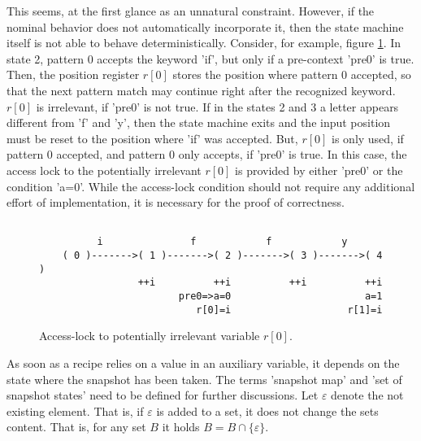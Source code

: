 \documentclass[12pt,a4paper]{scrartcl}
\begin{document}
This seems, at the first glance as an unnatural constraint. However, if the
nominal behavior does not automatically incorporate it, then the state machine
itself is not able to behave deterministically.  Consider, for example, figure
\ref{fig:access-lock}. In state 2, pattern 0 accepts the keyword 'if', but only
if a pre-context 'pre0' is true. Then, the position register $r[0]$ stores the
position where pattern 0 accepted, so that the next pattern match may continue
right after the recognized keyword. $r[0]$ is irrelevant, if 'pre0' is not
true. If in the states 2 and 3 a letter appears different from 'f' and 'y',
then the state machine exits and the input position must be reset to the
position where 'if' was accepted. But, $r[0]$ is only used, if pattern 0
accepted, and pattern 0 only accepts, if 'pre0' is true.  In this case, the
access lock to the potentially irrelevant $r[0]$ is provided by either 'pre0'
or the condition 'a=0'. While the access-lock condition should not require any
additional effort of implementation, it is necessary for the proof of
correctness.

\begin{figure}[htbp] \leavevmode \label{fig:access-lock}
\begin{verbatim}

          i               f            f            y         
    ( 0 )------->( 1 )------->( 2 )------->( 3 )------->( 4 )
                 ++i          ++i          ++i          ++i 
                        pre0=>a=0                       a=1
                           r[0]=i                    r[1]=i

\end{verbatim}
\caption{Access-lock to potentially irrelevant variable $r[0]$.}
\end{figure}

As soon as a recipe relies on a value in an auxiliary variable, it depends on
the state where the snapshot has been taken. The terms 'snapshot map' and 'set
of snapshot states' need to be defined for further discussions. Let
$\varepsilon$ denote the not existing element. That is, if $\varepsilon$ is
added to a set, it does not change the sets content. That is, for any set $B$
it holds $B = B \cap \{ \varepsilon \}$.
\end{document}
